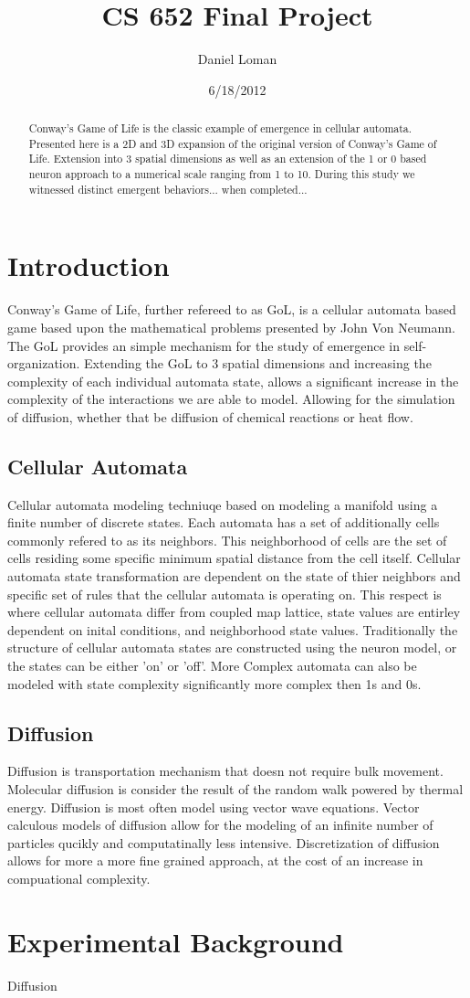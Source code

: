 \documentclass[11pt,twocolumn]{article}
\title{\textbf{CS 652 Final Project }}
\author{Daniel Loman}
\date{6/18/2012}
\begin{document}
\maketitle
\begin{abstract}
Conway's Game of Life is the classic example of emergence in cellular automata. Presented here is a 2D and 3D expansion of the original version of Conway's Game of Life. Extension into 3 spatial dimensions as well as an extension of the 1 or 0 based neuron approach to a numerical scale ranging from 1 to 10. During this study we witnessed distinct emergent behaviors... when completed...
\end{abstract}
\section{Introduction}
Conway's Game of Life, further refereed to as GoL, is a cellular automata based game based upon the mathematical problems presented by John Von Neumann. The GoL provides an simple mechanism for the study of emergence in self-organization.
Extending the GoL to 3 spatial dimensions and increasing the complexity of each individual automata state, allows a significant increase in the complexity of the interactions we are able to model. 
Allowing for the simulation of diffusion, whether that be diffusion of chemical reactions or heat flow.  
\subsection{Cellular Automata}
 Cellular automata modeling techniuqe based on modeling a manifold 
 using a finite number of discrete states. 
 Each automata has a set of additionally cells commonly refered to as its neighbors. 
 This neighborhood of cells are the set of cells residing some specific minimum spatial distance from the cell itself. 
 Cellular automata state transformation are dependent on the state of thier neighbors and specific set of rules that the cellular automata is operating on. 
 This respect is where cellular automata differ from coupled map lattice, state values are entirley dependent on inital conditions, and neighborhood state values.
 Traditionally the structure of cellular automata states are constructed using the neuron model, or the states can be either 'on' or 'off'. 
 More Complex automata can also be modeled with state complexity significantly more complex then 1s and 0s.
 \subsection{Diffusion}
 Diffusion is transportation mechanism that doesn not require bulk movement. 
 Molecular diffusion is consider the result of the random walk powered by thermal energy. 
 Diffusion is most often model using vector wave equations. Vector calculous models of diffusion allow for the modeling of an infinite number of particles qucikly and computatinally less intensive. 
 Discretization of diffusion allows for more a more fine grained approach, at the cost of an increase in compuational complexity.
\section{Experimental Background}
Diffusion
\end{document}
